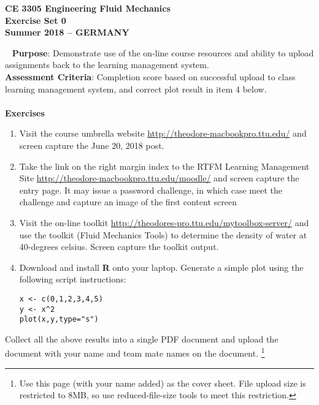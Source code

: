 \documentclass[12pt]{article}
\begin{document}
\begingroup
\begin{center}
{\textbf{{ CE 3305 Engineering Fluid Mechanics} \\ Exercise Set 0 \\ Summer 2018 -- GERMANY} }
\end{center}
\endgroup
\begingroup
~\newline
\textbf{Purpose}: Demonstrate use of the on-line course resources and ability to upload assignments back to the learning management system.\\
\textbf{Assessment Criteria}: Completion score based on successful upload to class learning management system, and correct plot result in item 4 below.\\~\\
\textbf{Exercises}
\begin{enumerate}
\item Visit the course umbrella website \url{http://theodore-macbookpro.ttu.edu/} and screen capture the June 20, 2018 post.
\item Take the link on the right margin index to the RTFM Learning Management Site \url{http://theodore-macbookpro.ttu.edu/moodle/} and screen capture the entry page.  It may issue a password challenge, in which case meet the challenge and capture an image of the first content screen
\item Visit the on-line toolkit \url{http://theodores-pro.ttu.edu/mytoolbox-server/} and use the toolkit (Fluid Mechanics Tools) to determine the density of water at 40-degrees celsius.  Screen capture the toolkit output.
\item Download and install \textbf{R} onto your laptop.  Generate a simple plot using the following script instructions:
\begin{verbatim}
x <- c(0,1,2,3,4,5)
y <- x^2
plot(x,y,type="s")
\end{verbatim}
\end{enumerate}
Collect all the above results into a single PDF document and upload the document with your name and team mate names on the document.    \footnote{Use this page (with your name added) as the cover sheet. File upload size is restricted to 8MB, so use reduced-file-size tools to meet this restriction.}
\end{document}
